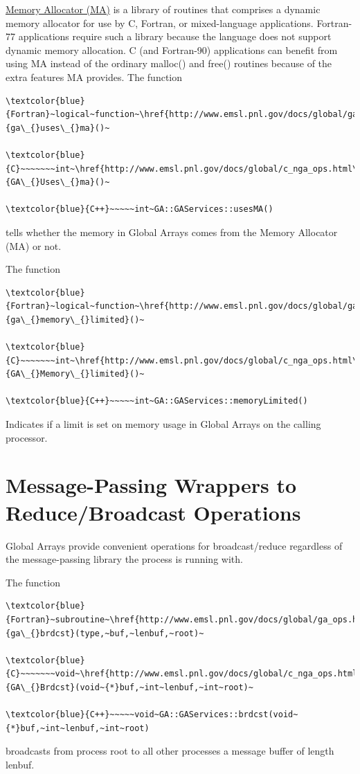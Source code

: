 \href{http://www.emsl.pnl.gov/docs/parsoft/ma/MAapi.html}{Memory Allocator (MA)}
is a library of routines that comprises a dynamic memory allocator
for use by C, Fortran, or mixed-language applications. Fortran- 77
applications require such a library because the language does not
support dynamic memory allocation. C (and Fortran-90) applications
can benefit from using MA instead of the ordinary malloc() and free()
routines because of the extra features MA provides. The function
\begin{verbatim}
\textcolor{blue}{Fortran}~logical~function~\href{http://www.emsl.pnl.gov/docs/global/ga_ops.html\#ga_uses_ma}{ga\_{}uses\_{}ma}()~

\textcolor{blue}{C}~~~~~~~int~\href{http://www.emsl.pnl.gov/docs/global/c_nga_ops.html\#ga_uses_ma}{GA\_{}Uses\_{}ma}()~

\textcolor{blue}{C++}~~~~~int~GA::GAServices::usesMA()
\end{verbatim}
tells whether the memory in Global Arrays comes from the Memory Allocator
(MA) or not.

The function
\begin{verbatim}
\textcolor{blue}{Fortran}~logical~function~\href{http://www.emsl.pnl.gov/docs/global/ga_ops.html\#ga_memory_limited}{ga\_{}memory\_{}limited}()~

\textcolor{blue}{C}~~~~~~~int~\href{http://www.emsl.pnl.gov/docs/global/c_nga_ops.html\#ga_memory_limited}{GA\_{}Memory\_{}limited}()~

\textcolor{blue}{C++}~~~~~int~GA::GAServices::memoryLimited()
\end{verbatim}
Indicates if a limit is set on memory usage in Global Arrays on the
calling processor. 


\section{Message-Passing Wrappers to Reduce/Broadcast Operations }

Global Arrays provide convenient operations for broadcast/reduce regardless
of the message-passing library the process is running with.

The function
\begin{verbatim}
\textcolor{blue}{Fortran}~subroutine~\href{http://www.emsl.pnl.gov/docs/global/ga_ops.html\#ga_brdcst}{ga\_{}brdcst}(type,~buf,~lenbuf,~root)~

\textcolor{blue}{C}~~~~~~~void~\href{http://www.emsl.pnl.gov/docs/global/c_nga_ops.html\#ga_brdcst}{GA\_{}Brdcst}(void~{*}buf,~int~lenbuf,~int~root)~

\textcolor{blue}{C++}~~~~~void~GA::GAServices::brdcst(void~{*}buf,~int~lenbuf,~int~root)
\end{verbatim}
broadcasts from process root to all other processes a message buffer
of length lenbuf.


